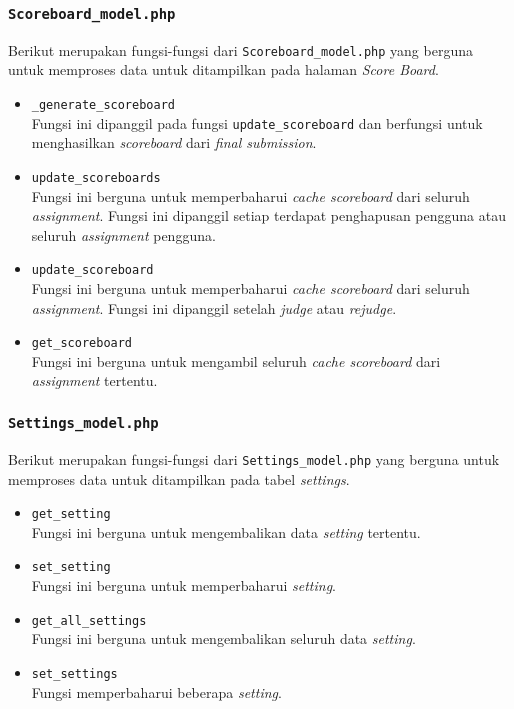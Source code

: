 \subsubsection{\texttt{Scoreboard\_model.php}}
Berikut merupakan fungsi-fungsi dari \texttt{Scoreboard\_model.php} yang berguna untuk memproses data untuk ditampilkan pada halaman \textit{Score Board}.
\begin{itemize}
	\item \texttt{\_generate\_scoreboard}\\
	Fungsi ini dipanggil pada fungsi \texttt{update\_scoreboard} dan berfungsi untuk menghasilkan \textit{scoreboard} dari \textit{final submission}.
	\item \texttt{update\_scoreboards}\\
	Fungsi ini berguna untuk memperbaharui \textit{cache scoreboard} dari seluruh \textit{assignment}. Fungsi ini dipanggil setiap terdapat penghapusan pengguna atau seluruh \textit{assignment} pengguna.
	\item \texttt{update\_scoreboard}\\
	Fungsi ini berguna untuk memperbaharui \textit{cache scoreboard} dari seluruh \textit{assignment}. Fungsi ini dipanggil setelah \textit{judge} atau \textit{rejudge}.
	\item \texttt{get\_scoreboard}\\
	Fungsi ini berguna untuk mengambil seluruh \textit{cache scoreboard} dari \textit{assignment} tertentu.
\end{itemize}
\subsubsection{\texttt{Settings\_model.php}}
Berikut merupakan fungsi-fungsi dari \texttt{Settings\_model.php} yang berguna untuk memproses data untuk ditampilkan pada tabel \textit{settings}.
\begin{itemize}
	\item \texttt{get\_setting}\\
	Fungsi ini berguna untuk mengembalikan data \textit{setting} tertentu.
	\item \texttt{set\_setting}\\
	Fungsi ini berguna untuk memperbaharui \textit{setting}.
	\item \texttt{get\_all\_settings}\\
	Fungsi ini berguna untuk mengembalikan seluruh data \textit{setting}.
	\item \texttt{set\_settings}\\
	Fungsi memperbaharui beberapa \textit{setting}.
\end{itemize}
